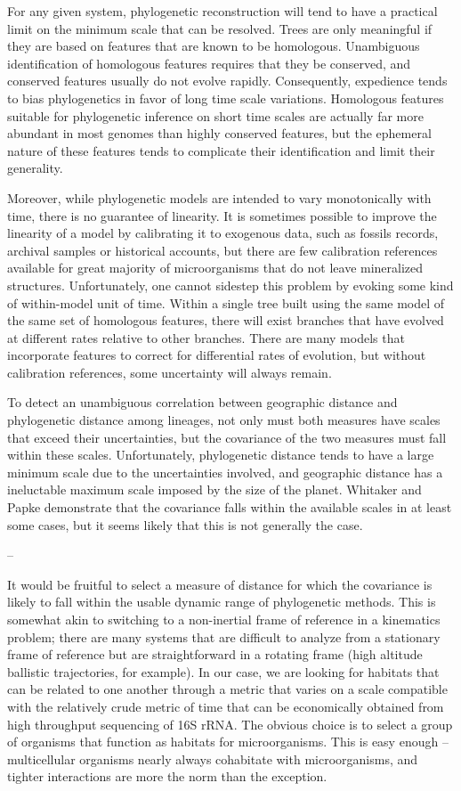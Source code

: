 For any given system, phylogenetic reconstruction will tend to have a practical limit on the minimum scale that can be resolved. Trees are only meaningful if they are based on features that are known to be homologous. Unambiguous identification of homologous features requires that they be conserved, and conserved features usually do not evolve rapidly. Consequently, expedience tends to bias phylogenetics in favor of long time scale variations. Homologous features suitable for phylogenetic inference on short time scales are actually far more abundant in most genomes than highly conserved features, but the ephemeral nature of these features tends to complicate their identification and limit their generality. 

Moreover, while phylogenetic models are intended to vary monotonically with time, there is no guarantee of linearity. It is sometimes possible to improve the linearity of a model by calibrating it to exogenous data, such as fossils records, archival samples or historical accounts, but there are few calibration references available for great majority of microorganisms that do not leave mineralized structures. Unfortunately, one cannot sidestep this problem by evoking some kind of within-model unit of time. Within a single tree built using the same model of the same set of homologous features, there will exist branches that have evolved at different rates relative to other branches. There are many models that incorporate features to correct for differential rates of evolution, but without calibration references, some uncertainty will always remain.

To detect an unambiguous correlation between geographic distance and phylogenetic distance among lineages, not only must both measures have scales that exceed their uncertainties, but the covariance of the two measures must fall within these scales. Unfortunately, phylogenetic distance tends to have a large minimum scale due to the uncertainties involved, and geographic distance has a ineluctable maximum scale imposed by the size of the planet. Whitaker and Papke demonstrate that the covariance falls within the available scales in at least some cases, but it seems likely that this is not generally the case.

--

It would be fruitful to select a measure of distance for which the covariance is likely to fall within the usable dynamic range of phylogenetic methods. This is somewhat akin to switching to a non-inertial frame of reference in a kinematics problem; there are many systems that are difficult to analyze from a stationary frame of reference but are straightforward in a rotating frame (high altitude ballistic trajectories, for example). In our case, we are looking for habitats that can be related to one another through a metric that varies on a scale compatible with the relatively crude metric of time that can be economically obtained from high throughput sequencing of 16S rRNA. The obvious choice is to select a group of organisms that function as habitats for microorganisms. This is easy enough -- multicellular organisms nearly always cohabitate with microorganisms, and tighter interactions are more the norm than the exception.

